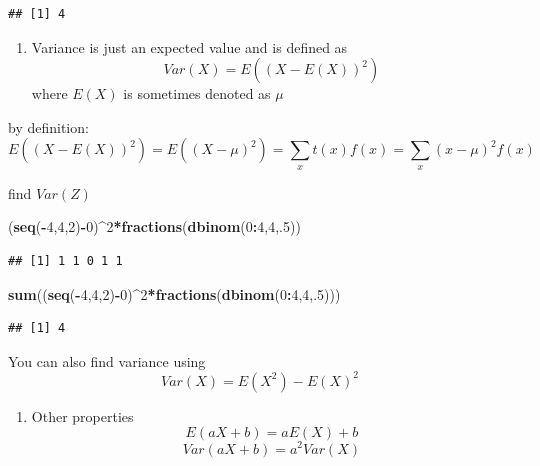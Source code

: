 \documentclass[]{book}
\newenvironment{Shaded}{\begin{snugshade}}{\end{snugshade}}
\newcommand{\KeywordTok}[1]{\textcolor[rgb]{0.13,0.29,0.53}{\textbf{#1}}}
\newcommand{\DecValTok}[1]{\textcolor[rgb]{0.00,0.00,0.81}{#1}}
\newcommand{\OperatorTok}[1]{\textcolor[rgb]{0.81,0.36,0.00}{\textbf{#1}}}
\newcommand{\NormalTok}[1]{#1}
\providecommand{\tightlist}{%
  \setlength{\itemsep}{0pt}\setlength{\parskip}{0pt}}
\theoremstyle{definition}
\theoremstyle{definition}
\theoremstyle{definition}
\theoremstyle{remark}
\begin{document}
\begin{verbatim}
## [1] 4
\end{verbatim}

\begin{enumerate}
\def\labelenumi{\arabic{enumi}.}
\setcounter{enumi}{3}
\tightlist
\item
  Variance is just an expected value and is defined as
  \[Var(X)=E((X-E(X))^2)\] where \(E(X)\) is sometimes denoted as
  \(\mu\)
\end{enumerate}

by definition:
\[E((X-E(X))^2)=E((X-\mu)^2)=\sum_{x}t(x)f(x)=\sum_{x}(x-\mu)^2f(x)\]

find \(Var(Z)\)

\begin{Shaded}
\begin{Highlighting}[]
\NormalTok{(}\KeywordTok{seq}\NormalTok{(}\OperatorTok{-}\DecValTok{4}\NormalTok{,}\DecValTok{4}\NormalTok{,}\DecValTok{2}\NormalTok{)}\OperatorTok{-}\DecValTok{0}\NormalTok{)}\OperatorTok{^}\DecValTok{2}\OperatorTok{*}\KeywordTok{fractions}\NormalTok{(}\KeywordTok{dbinom}\NormalTok{(}\DecValTok{0}\OperatorTok{:}\DecValTok{4}\NormalTok{,}\DecValTok{4}\NormalTok{,.}\DecValTok{5}\NormalTok{))}
\end{Highlighting}
\end{Shaded}

\begin{verbatim}
## [1] 1 1 0 1 1
\end{verbatim}

\begin{Shaded}
\begin{Highlighting}[]
\KeywordTok{sum}\NormalTok{((}\KeywordTok{seq}\NormalTok{(}\OperatorTok{-}\DecValTok{4}\NormalTok{,}\DecValTok{4}\NormalTok{,}\DecValTok{2}\NormalTok{)}\OperatorTok{-}\DecValTok{0}\NormalTok{)}\OperatorTok{^}\DecValTok{2}\OperatorTok{*}\KeywordTok{fractions}\NormalTok{(}\KeywordTok{dbinom}\NormalTok{(}\DecValTok{0}\OperatorTok{:}\DecValTok{4}\NormalTok{,}\DecValTok{4}\NormalTok{,.}\DecValTok{5}\NormalTok{)))}
\end{Highlighting}
\end{Shaded}

\begin{verbatim}
## [1] 4
\end{verbatim}

You can also find variance using \[Var(X)=E(X^2)-E(X)^2\]

\begin{enumerate}
\def\labelenumi{\arabic{enumi}.}
\setcounter{enumi}{4}
\tightlist
\item
  Other properties \[E(aX+b)=aE(X)+b\] \[Var(aX+b)=a^2Var(X)\]
\end{enumerate}
\end{document}
